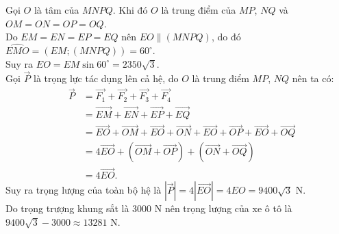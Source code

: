 \begin{bt}
{{
		}
		Gọi $O$ là tâm của $MNPQ$. Khi đó $O$ là trung điểm của $MP$, $NQ$ và $OM = ON  = OP  = OQ$.\\
		Do $EM = EN = EP =EQ$ nên $EO \parallel (MNPQ)$, do đó $\widehat{EMO} = \left(EM;(MNPQ)\right) = 60^\circ$.\\
		Suy ra $EO = EM \sin 60^\circ = 2350\sqrt{3}$.\\
		Gọi $\vec{P}$ là trọng lực tác dụng lên cả hệ, do $O$ là trung điểm $MP$, $NQ$ nên ta có:
		\begin{eqnarray*}
			& \vec{P} & = \vec{F_1}+\vec{F_2}+\vec{F_3}+\vec{F_4}\\
			& & = \vec{EM } + \vec{EN} + \vec{EP} + \vec{EQ}\\
			& & = \vec{EO} + \vec{OM} + \vec{EO} + \vec{ON} + \vec{EO} + \vec{OP} + \vec{EO} + \vec{OQ}\\
			& & = 4\vec{EO} + \left(\vec{OM} + \vec{OP}\right) + \left(\vec{ON} + \vec{OQ}\right)\\
			& & = 4\vec{EO}. 
		\end{eqnarray*} 
		Suy ra trọng lượng của toàn bộ hệ là $\left| \vec{P} \right| = 4\left| \vec{EO}\right| = 4EO = 9400\sqrt{3}$ N.\\
		Do trọng trượng khung sắt là $3000$ N nên trọng lượng của xe ô tô là $9400\sqrt{3} - 3000 \approx 13281$ N.
	}
\end{bt}

